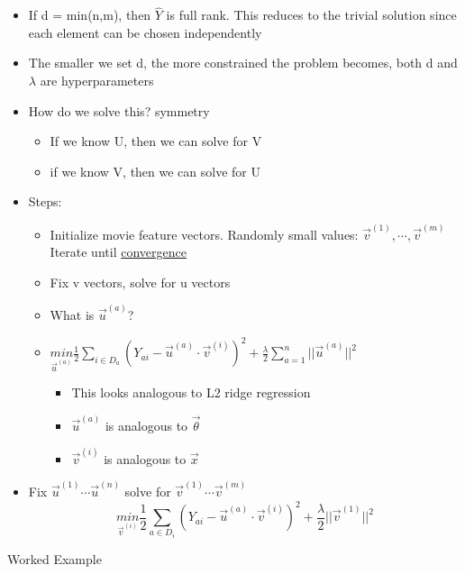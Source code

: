 \documentclass[10pt, oneside]{article}
\begin{document}
\begin{itemize}
\begin{itemize}
        \item If d = min(n,m), then $\hat Y$ is full rank. This reduces to the trivial solution since each element can be chosen independently
        \item The smaller we set d, the more constrained the problem becomes, both d and $\lambda$ are hyperparameters
        \item How do we solve this? symmetry
        \begin{itemize}
            \item If we know U, then we can solve for V
            \item if we know V, then we can solve for U
            
        \end{itemize}
        \item Steps:
            \begin{itemize}
                \item Initialize movie feature vectors. Randomly small values: $\vec v^{(1)}, \cdots, \vec v^{(m)}$\\Iterate until \underline{convergence}
                \item Fix v vectors, solve for u vectors
                \item What is $\vec u^{(a)}$?
                \item $\underset{\vec u^{(a)}}{min} \frac{1}{2} \underset{i \in D_a}{\sum} (Y_{ai} - \vec u^{(a)} \cdot \vec v^{(i)})^2 + \frac{\lambda}{2} \sum_{a=1}^n ||\vec u^{(a)} ||^2$
                \begin{itemize}
                    \item This looks analogous to L2 ridge regression
                    \item $\vec u^{(a)}$ is analogous to $\vec \theta$
                    \item $\vec v^{(i)}$ is analogous to $\vec x$
                \end{itemize}
            \end{itemize}
            \item Fix $\vec u^{(1)} \cdots \vec u^{(n)}$ solve for $\vec v^{(1)} \cdots \vec v^{(m)}$
            \[\underset{\vec v^{(i)}}{min} \frac{1}{2}\sum_{a\in D_i} (Y_{ai} - \vec u^{(a)} \cdot \vec v^{(i)})^2 + \frac{\lambda}{2} ||\vec v^{(1)}||^2\]
        \end{itemize}
\end{itemize}
Worked Example
\end{document}
